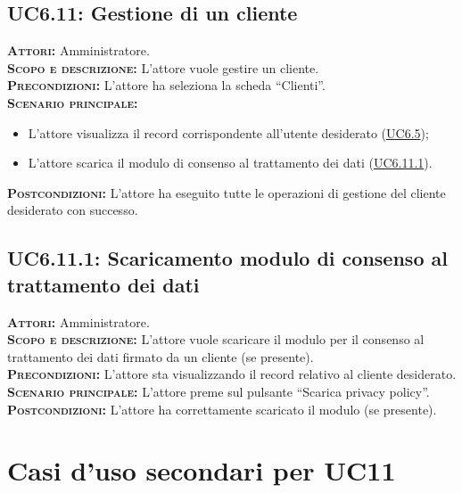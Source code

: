 \subsection{UC6.11: Gestione di un cliente}
\label{sec:UC611}
\textsc{\textbf{Attori:}} Amministratore.\\
\textsc{\textbf{Scopo e descrizione:}} L'attore vuole gestire un cliente.\\
\textsc{\textsc{\textbf{Precondizioni:}}} L'attore ha seleziona la scheda ``Clienti''.\\
\textsc{\textbf{Scenario principale:}} 
\begin{itemize}
    \item L'attore visualizza il record corrispondente all'utente desiderato (\hyperref[sec:UC65]{UC6.5});
    \item L'attore scarica il modulo di consenso al trattamento dei dati (\hyperref[sec:UC6101]{UC6.11.1}).
\end{itemize}
\textsc{\textbf{Postcondizioni:}} L'attore ha eseguito tutte le operazioni di gestione del cliente desiderato con successo.

\subsection{UC6.11.1: Scaricamento modulo di consenso al trattamento dei dati}
\label{sec:UC6111}
\textsc{\textbf{Attori:}} Amministratore.\\
\textsc{\textbf{Scopo e descrizione:}} L'attore vuole scaricare il modulo per il consenso al trattamento dei dati firmato da un cliente (se presente).\\
\textsc{\textsc{\textbf{Precondizioni:}}} L'attore sta visualizzando il record relativo al cliente desiderato.\\
\textsc{\textbf{Scenario principale:}} L'attore preme sul pulsante ``Scarica privacy policy''.\\
\textsc{\textbf{Postcondizioni:}} L'attore ha correttamente scaricato il modulo (se presente).

\section{Casi d'uso secondari per UC11}
